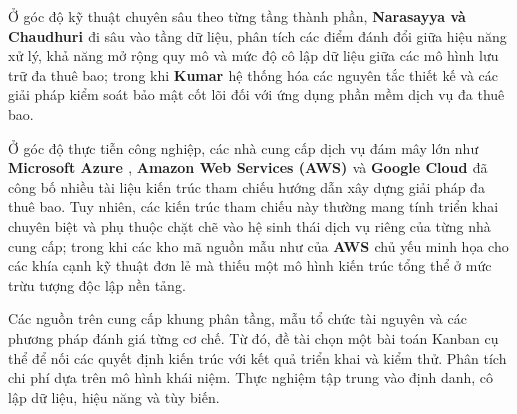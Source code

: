Ở góc độ kỹ thuật chuyên sâu theo từng tầng thành phần, \textbf{Narasayya và Chaudhuri \cite{v4-08}} đi sâu vào tầng dữ liệu, phân tích các điểm đánh đổi giữa hiệu năng xử lý, khả năng mở rộng quy mô và mức độ cô lập dữ liệu giữa các mô hình lưu trữ đa thuê bao; trong khi \textbf{Kumar \cite{v4-09}} hệ thống hóa các nguyên tắc thiết kế và các giải pháp kiểm soát bảo mật cốt lõi đối với ứng dụng phần mềm dịch vụ đa thuê bao.

Ở góc độ thực tiễn công nghiệp, các nhà cung cấp dịch vụ đám mây lớn như \textbf{Microsoft Azure \cite{v4-10}}, \textbf{Amazon Web Services (AWS) \cite{v4-11}} và \textbf{Google Cloud \cite{v4-12}} đã công bố nhiều tài liệu kiến trúc tham chiếu hướng dẫn xây dựng giải pháp đa thuê bao. Tuy nhiên, các kiến trúc tham chiếu này thường mang tính triển khai chuyên biệt và phụ thuộc chặt chẽ vào hệ sinh thái dịch vụ riêng của từng nhà cung cấp; trong khi các kho mã nguồn mẫu như của \textbf{AWS \cite{v4-13}} chủ yếu minh họa cho các khía cạnh kỹ thuật đơn lẻ mà thiếu một mô hình kiến trúc tổng thể ở mức trừu tượng độc lập nền tảng.

Các nguồn trên cung cấp khung phân tầng, mẫu tổ chức tài nguyên và các phương pháp đánh giá từng cơ chế. Từ đó, đề tài chọn một bài toán Kanban cụ thể để nối các quyết định kiến trúc với kết quả triển khai và kiểm thử. Phân tích chi phí dựa trên mô hình khái niệm. Thực nghiệm tập trung vào định danh, cô lập dữ liệu, hiệu năng và tùy biến.

\label{v4-intro-2}

